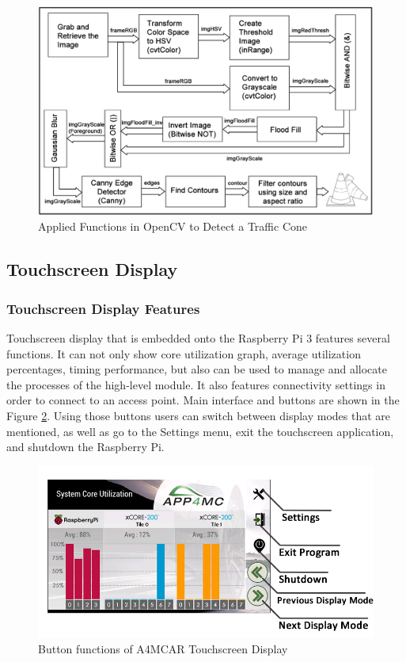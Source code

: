\begin{figure}[!ht]
	\centering
	\captionsetup{justification=centering}
	\includegraphics[width=\textwidth]{content/images/imageproc.png}
	\caption{Applied Functions in OpenCV to Detect a Traffic Cone}
	\label{fig:imageproc}
\end{figure}

\subsection{Touchscreen Display}
\subsubsection{Touchscreen Display Features}
Touchscreen display that is embedded onto the Raspberry Pi 3 features several functions. It can not only show core utilization graph, average utilization percentages, timing performance, but also can be used to manage and allocate the processes of the high-level module. It also features connectivity settings in order to connect to an access point. Main interface and buttons are shown in the Figure \ref{fig:displaybuttons}. Using those buttons users can switch between display modes that are mentioned, as well as go to the Settings menu, exit the touchscreen application, and shutdown the Raspberry Pi. 
\begin{figure}[!ht]
	\centering
	\captionsetup{justification=centering}
	\includegraphics[scale=0.5]{content/images/displaybuttons.png}
	\caption{Button functions of A4MCAR Touchscreen Display}
	\label{fig:displaybuttons}
\end{figure}


